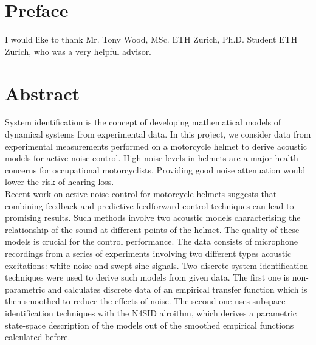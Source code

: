 


 

\chapter*{Preface}

I would like to thank Mr. Tony Wood, MSc. ETH Zurich, Ph.D. Student ETH Zurich, who was a very helpful advisor.

 \cleardoublepage





 \setcounter{tocdepth}{2}
 \tableofcontents

 \cleardoublepage


%
%
%
 \cleardoublepage

\chapter*{Abstract}
System identification is the concept of developing mathematical models of dynamical systems from experimental data. In this project, we consider data from experimental measurements performed on a motorcycle helmet to derive acoustic models for active noise control. High noise levels in helmets are a major health concerns for occupational motorcyclists. Providing good noise attenuation would lower the risk of hearing loss.\\

Recent work on active noise control for motorcycle helmets suggests that combining feedback and predictive feedforward control techniques can lead to promising results. Such methods involve two acoustic models characterising the relationship of the sound at different points of the  helmet. The quality of these models is crucial for the control performance. The data consists of microphone recordings from a series of experiments involving two different types acoustic excitations: white noise and swept sine signals. Two discrete system identification techniques were used to derive such models from given data. The first one is non-parametric and calculates discrete data of an empirical transfer function which is then smoothed to reduce the effects of noise. The second one uses subspace identification techniques with the N4SID alroithm, which derives a parametric state-space description of the models out of the smoothed empirical functions calculated before. 

